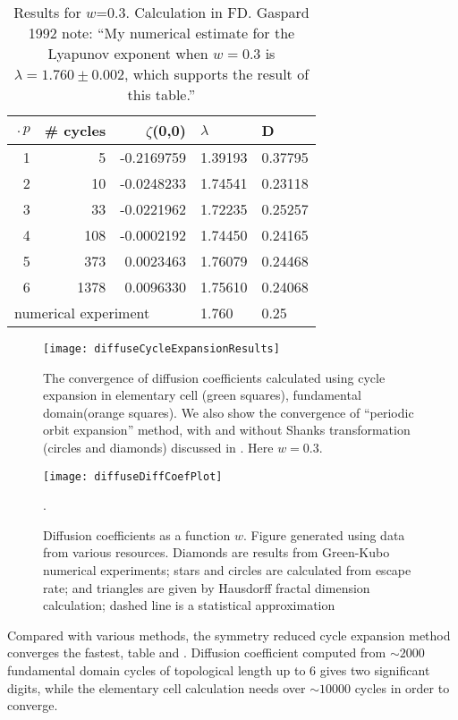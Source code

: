 \begin{table}[htbp]
\hfill
\begin{tabular}{|r|r|r|l|l|}
\hline
$\period{p}$ & \# cycles & $\zeta$(0,0) & $\lambda$ & D \\ \hline\hline
1      & 5      & -0.2169759 & 1.39193 & 0.37795 \\
2      & 10     & -0.0248233 & 1.74541 & 0.23118\\
3      & 33     & -0.0221962 & 1.72235 & 0.25257\\
4      & 108    & -0.0002192 & 1.74450 & 0.24165\\
5      & 373    &  0.0023463 & 1.76079 & 0.24468\\
6      & 1378   &  0.0096330 & 1.75610 & 0.24068\\ \hline\hline
\multicolumn{3}{|l|}{numerical experiment}
                           & 1.760 & 0.25
\\ \hline
\end{tabular}
\caption{\label{TCELL2}
  Results for $w$=0.3. Calculation in FD. Gaspard 1992 note: ``My
  numerical estimate for the Lyapunov exponent when $w=0.3$ is
  $\lambda = 1.760 \pm 0.002$, which supports the result of this
  table.''
}
\end{table}

\begin{figure}[htbp]
  \texttt{[image: diffuseCycleExpansionResults]}
  \caption[]{\label{fig-convergence}
  The convergence of diffusion coefficients  calculated using cycle
  expansion in elementary cell (green squares),  fundamental
  domain(orange squares). We  also show the convergence of ``periodic
  orbit expansion'' method, with and  without Shanks transformation
  (circles and diamonds) discussed in  . Here $w =
  0.3$.
  }
\end{figure}

\begin{figure}
\texttt{[image: diffuseDiffCoefPlot]}
  \caption[]{\label{fig-results} Diffusion coefficients as a function
  $w$.  Figure generated using data from various resources. Diamonds
  are results from  Green-Kubo numerical experiments;
  stars and  circles are calculated from
  escape rate; and triangles are  given by Hausdorff fractal dimension
  calculation; dashed line  is a statistical
  approximation}.
\end{figure}


Compared with various methods, the symmetry reduced cycle expansion
method converges the fastest, table  and
. Diffusion coefficient computed from
$\sim2000$ fundamental domain cycles of topological length up to 6
gives two significant digits, while the elementary cell calculation
needs over $\sim 10000$ cycles in order to converge.

